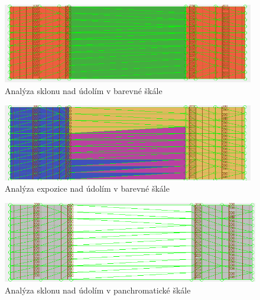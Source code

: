 \documentclass[a4paper,11pt,twoside]{article}
\begin{document}
\vspace{0.2cm}
\begin{figure}[hbt!] 
\begin{center}
\includegraphics[width=11cm]{pictures/valley_colorful_slope.PNG} 
\caption[Analýza sklonu nad údolím v barevné škále]{Analýza sklonu nad údolím v barevné škále}
\label{fig:valley_colorful_slope}
\end{center}
\end{figure}

\vspace{0.2cm}
\begin{figure}[hbt!] 
\begin{center}
\includegraphics[width=11cm]{pictures/valley_colorful_aspect.PNG} 
\caption[Analýza expozice nad údolím v barevné škále]{Analýza expozice nad údolím v barevné škále}
\label{fig:valley_colorful_aspect}
\end{center}
\end{figure}

\vspace{0.2cm}
\begin{figure}[hbt!] 
\begin{center}
\includegraphics[width=13cm]{pictures/valley_panchromatic_slope.PNG} 
\caption[Analýza sklonu nad údolím v panchromatické škále]{Analýza sklonu nad údolím v panchromatické škále}
\label{fig:valley__panchromatic_slope}
\end{center}
\end{figure}
\end{document}
